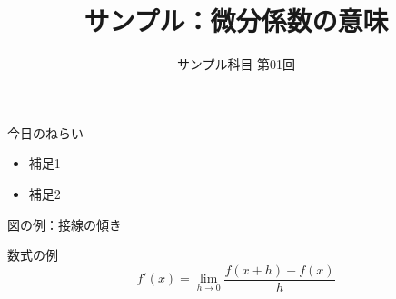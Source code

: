 \documentclass[aspectratio=169]{beamer}
\title{サンプル：微分係数の意味}
\subtitle{サンプル科目 第01回}
\author{}
\date{}
\begin{document}
\begin{frame}
  \titlepage
\end{frame}

\begin{frame}{今日のねらい}
  \begin{itemize}
    \item 補足1
    \item 補足2
  \end{itemize}
\end{frame}

\begin{frame}{図の例：接線の傾き}
  \begin{center}
    
  \end{center}
\end{frame}

\begin{frame}{数式の例}
  \[
    f'(x) = \lim_{h \to 0} \frac{f(x+h) - f(x)}{h}
  \]
\end{frame}
\end{document}
